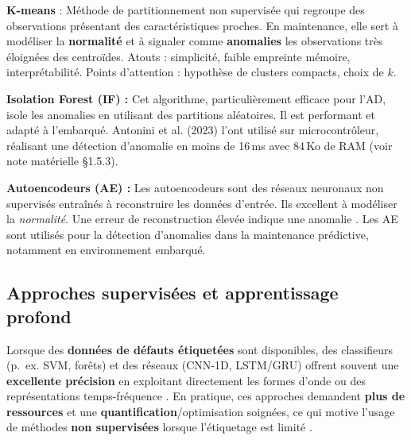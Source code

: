 \textbf{K-means} \cite{macqueen1967,chandola2009} : Méthode de partitionnement non supervisée qui regroupe des observations présentant des caractéristiques proches. En maintenance, elle sert à modéliser la \textbf{normalité} et à signaler comme \textbf{anomalies} les observations très éloignées des centroïdes. Atouts : simplicité, faible empreinte mémoire, interprétabilité. Points d'attention : hypothèse de clusters compacts, choix de $k$.

\textbf{Isolation Forest (IF) :} Cet algorithme, particulièrement efficace pour l'AD, isole les anomalies en utilisant des partitions aléatoires. Il est performant et adapté à l'embarqué. Antonini et al. (2023) l'ont utilisé sur microcontrôleur, réalisant une détection d'anomalie en moins de 16\,ms avec 84\,Ko de RAM \cite{antonini2023} (voir note matérielle §1.5.3).

\textbf{Autoencodeurs (AE) :} Les autoencodeurs sont des réseaux neuronaux non supervisés entraînés à reconstruire les données d'entrée. Ils excellent à modéliser la \textit{normalité}. Une erreur de reconstruction élevée indique une anomalie \cite{ran2019}. Les AE sont utilisés pour la détection d'anomalies dans la maintenance prédictive, notamment en environnement embarqué.

\subsection{Approches supervisées et apprentissage profond}

Lorsque des \textbf{données de défauts étiquetées} sont disponibles, des classifieurs (p.~ex. SVM, forêts) et des réseaux (CNN-1D, LSTM/GRU) offrent souvent une \textbf{excellente précision} en exploitant directement les formes d'onde ou des représentations temps-fréquence \cite{bagri2024,langer2025}. En pratique, ces approches demandent \textbf{plus de ressources} et une \textbf{quantification}/optimisation soignées, ce qui motive l'usage de méthodes \textbf{non supervisées} lorsque l'étiquetage est limité \cite{ran2019}.

